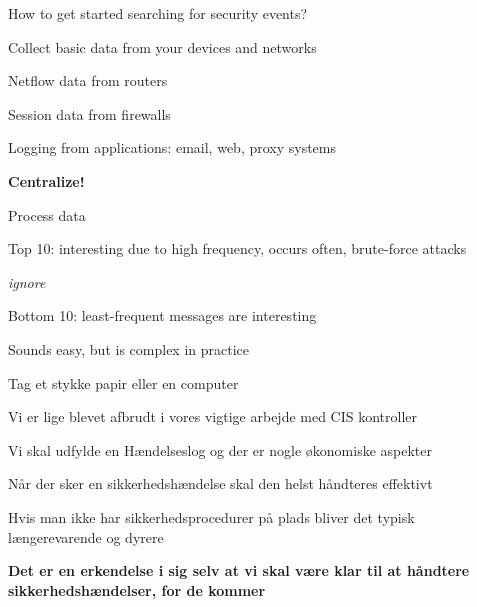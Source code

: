 \documentclass[Screen16to9,17pt]{foils}
\begin{document}

\begin{list1}
\item How to get started searching for security events?
\item Collect basic data from your devices and networks
\begin{list2}
\item Netflow data from routers
\item Session data from firewalls
\item Logging from applications: email, web, proxy systems
\end{list2}
\item {\bf Centralize!}
\item Process data
\begin{list2}
\item Top 10: interesting due to high frequency, occurs often, brute-force attacks
\item {\it ignore}
\item Bottom 10: least-frequent messages are interesting
\end{list2}
\end{list1}

Sounds easy, but is complex in practice


Tag et stykke papir eller en computer
\begin{list2}
\item Vi er lige blevet afbrudt i vores vigtige arbejde med CIS kontroller
\item Vi skal udfylde en Hændelseslog og der er nogle økonomiske aspekter
\item Når der sker en sikkerhedshændelse skal den helst håndteres effektivt
\item Hvis man ikke har sikkerhedsprocedurer på plads bliver det typisk længerevarende og dyrere
\end{list2}


{\bf Det er en erkendelse i sig selv at vi skal være klar til at håndtere sikkerhedshændelser, for de kommer}
\end{document}
